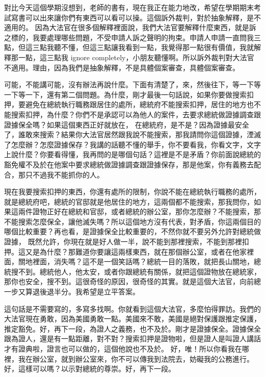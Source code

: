 \hypertarget{c11:cue:188}{}對比今天這個學期沒想到，老師的書有，現在我正在能力地改，希望在學期期末考試寫書可以出來讓你們有東西可以看可以操。這個訴外裁判，對於抽象解釋，是不適用的。
\hypertarget{c11:cue:189}{}因為大法官在很多個解釋裡面說，我們大法官要解釋什麼東西，就是訴之標的，我要處理哪些問題，不受申請人訴之聲明的拘束。申請人申請一直問我三點，但這三點我聽不懂，但這三點讓我看到一點，我覺得那一點很有價值，我就解釋那一點，這三點我 ignore completely，小朋友聽懂啊。所以訴外裁判對大法官不適用。理由，因為我們是抽象解釋，不是具體個案審查，具體個案審查。

\hypertarget{c11:cue:190}{}可能，不能講可能，沒有辦法再說什麼。下面有清楚了，來，然後往下，等一下等一下等一下，還有第二個問題。為什麼，剛才最後一句話說，如果你要做搜索扣押，要避免在總統執行職務跟居住的處所，總統府不能搜索扣押，居住的地方也不能搜索扣押，為什麼？你們不是承認可以為他人的案件，去要求總統做證據調查跟證據保全嗎？如果這個東西正好就放在，
\hypertarget{c11:cue:191}{}在總統府，是不是？因為證據最安全了，誰敢來搜索？結果你大法官居然跟我說不能搜索，那我請問你這個證據，湮滅了怎麼辦？怎麼證據保存？我講的話聽不懂的舉手，你不要看我，你看文字，文字上說什麼？你要看得懂，我再問的是哪個句話？這裡是不是矛盾？你前面說總統的豁免權不及於在他案中要求總統做證據調查跟證據保存，那是他案，你有義務去配合，那只不過我不能抓你的人。

\hypertarget{c11:cue:192}{}現在我要搜索扣押的東西，你還有處所的限制，你說不能在總統執行職務的處所，就是總統府吧，總統的官邸就是他居住的地方，這兩個都不能搜索，那我問你，如果這兩件證物正好在總統和官邸，或者總統的辦公室，那你怎麼辦？不能搜索，那不能搜索怎麼保全，讓他滅失嗎？所以這個地方沒有代表，對矛盾，你這兩個目的哪個比較重要？再也看，是證據保全比較重要的，不然你就不要另外允許對總統做證據，
\hypertarget{c11:cue:193}{}既然允許，你現在就是好人做一半，說不能到那裡搜索，不能到那裡扣押。這又是為什麼？那難道你要讓這兩樣東西，就在那個辦公室，或者在他家裡面，關地裡面，消失嗎？這不是一個笑話嗎？總統一目的落敗，就把長山關地，總統搜不到。總統他人，他太安，或者你跟總統有關係，就把這個證物放在總統家，那你也安全，搜不到。這很奇怪的原因，很奇怪的其實。就是這個大法官，向前總一步又算退後退半分。我希望是立平答案。

\hypertarget{c11:cue:194}{}這句話是不需要寫的，多寫多找啊。你就看到這個大法官，多麼怕得罪訪。我們的大法官現在勇敢，因為美國勇敢一點。美國來不敢，美國是絕對保護跟推定保護，推定豁免。好，再下一段，為證人之義務，也不及於。剛才是證據保全。證據保全跟為證人，還是有一點距離，對不對？搜索扣押是證物啦，但是證人是叫證人講話才有證典啦，證言也可以做的，這個他說也不及於。
\hypertarget{c11:cue:195}{}好，唯！所以你看我在哪裡，我在辦公室，就到辦公室來，你不可以傳我到法院去，妨礙我的公務進行。好，這樣可以嗎？以示對總統的尊崇。好，再下一段。

